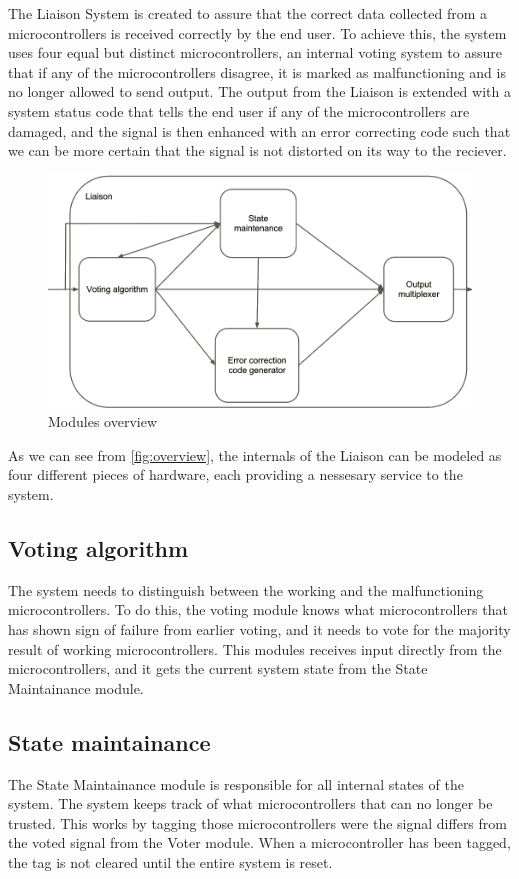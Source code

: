 The Liaison System is created to assure that the correct data collected from a microcontrollers is received correctly by the end user.
To achieve this, the system uses four equal but distinct microcontrollers, an internal voting system to assure that if any of the microcontrollers
disagree, it is marked as malfunctioning and is no longer allowed to send output. The output from the Liaison is extended with a system status
code that tells the end user if any of the microcontrollers are damaged, and the signal is then enhanced with an error correcting code such that
we can be more certain that the signal is not distorted on its way to the reciever.

\begin{figure}[h]
\includegraphics[width=15cm]{design/fig_overview}
\caption{Modules overview}
\label{fig:overview}
\end{figure}

As we can see from \autoref{fig:overview}, the internals of the Liaison can be modeled as four different pieces of hardware, each providing a
nessesary service to the system.

\subsection{Voting algorithm}
The system needs to distinguish between the working and the malfunctioning microcontrollers. To do this, the voting module knows what microcontrollers
that has shown sign of failure from earlier voting, and it needs to vote for the majority result of working microcontrollers. This modules
receives input directly from the microcontrollers, and it gets the current system state from the State Maintainance module.

\subsection{State maintainance}
The State Maintainance module is responsible for all internal states of the system. The system keeps track of what microcontrollers that can
no longer be trusted. This works by tagging those microcontrollers were the signal differs from the voted signal from the Voter module. When
a microcontroller has been tagged, the tag is not cleared until the entire system is reset.

